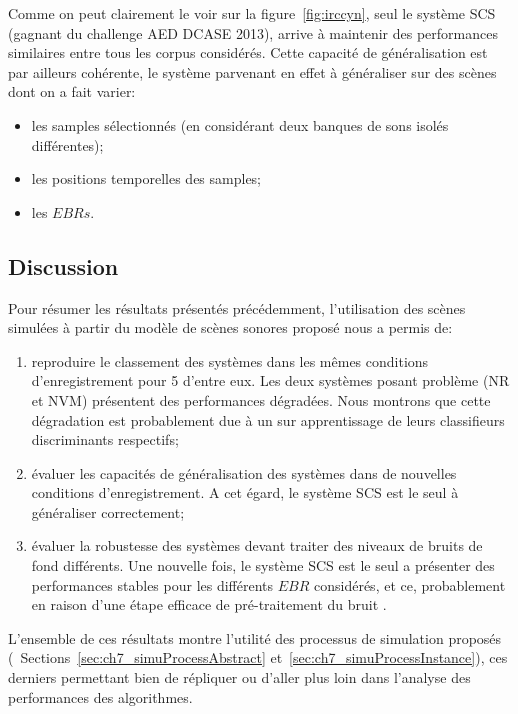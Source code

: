 Comme on peut clairement le voir sur la figure~\ref{fig:irccyn}, seul le système SCS (gagnant du challenge AED DCASE 2013), arrive à maintenir des performances similaires entre tous les corpus considérés. Cette capacité de généralisation est par ailleurs cohérente, le système parvenant en effet à généraliser sur des scènes dont on a fait varier: 

\begin{itemize}
\item les samples sélectionnés (en considérant deux banques de sons isolés différentes);
\item les positions temporelles des samples;
\item les $EBRs$.
\end{itemize}

\subsection{Discussion}

Pour résumer les résultats présentés précédemment, l'utilisation des scènes simulées à partir du modèle de scènes sonores proposé nous a permis de:

\begin{enumerate}
\item reproduire le classement des systèmes dans les mêmes conditions d'enregistrement pour 5 d'entre eux. Les deux systèmes posant problème (NR et NVM) présentent des performances dégradées. Nous montrons que cette dégradation est probablement due à un sur apprentissage de leurs  classifieurs discriminants respectifs;
\item évaluer les capacités de généralisation des systèmes dans de nouvelles conditions d'enregistrement. A cet égard, le système SCS est le seul à généraliser correctement;
\item évaluer la robustesse des systèmes devant traiter des niveaux de bruits de fond différents. Une nouvelle fois, le système SCS est le seul a présenter des performances stables pour les différents $EBR$ considérés, et ce, probablement en raison d'une étape efficace de pré-traitement du bruit .
\end{enumerate}

L'ensemble de ces résultats montre l'utilité des processus de simulation proposés (\cf~Sections~\ref{sec:ch7_simuProcessAbstract} et~\ref{sec:ch7_simuProcessInstance}), ces derniers permettant bien de répliquer ou d'aller plus loin dans l'analyse des performances des algorithmes.

